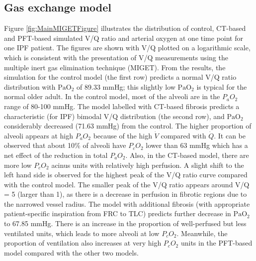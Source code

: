 \subsection{Gas exchange model}
Figure \ref{fig:MainMIGETFigure} illustrates the distribution of control, CT-based and PFT-based simulated V/Q ratio and arterial oxygen at one time point for one IPF patient. The figures are shown with V/Q plotted on a logarithmic scale, which is consistent with the presentation of V/Q measurements using the multiple inert gas elimination technique (MIGET). From the results, the simulation for the control model (the first row) predicts a normal V/Q ratio distribution with $\mathrm{PaO_2}$ of 89.33 mmHg; this slightly low $\mathrm{PaO_2}$ is typical for the normal older adult. In the control model, most of the alveoli are in the $P_aO_2$ range of 80-100 mmHg. The model labelled with CT-based fibrosis predicts a characteristic (for IPF) bimodal V/Q distribution (the second row), and $\mathrm{PaO_2}$ considerably decreased (71.63 mmHg) from the control. The higher proportion of alveoli appears at high $P_aO_2$ because of the high $\dot{V}$ compared with $\dot{Q}$. It can be observed that about 10\% of alveoli have $P_cO_2$ lower than 63 mmHg which has a net effect of the reduction in total $P_aO_2$. Also, in the CT-based model, there are more low $P_cO_2$ acinus units with relatively high perfusion. A slight shift to the left hand side is observed for the highest peak of the V/Q ratio curve compared with the control model. The smaller peak of the V/Q ratio appears around V/Q = 5 (larger than 1), as there is a decrease in perfusion in fibrotic regions due to the narrowed vessel radius. The model with additional fibrosis (with appropriate patient-specific inspiration from FRC to TLC) predicts further decrease in $\mathrm{PaO_2}$ to 67.85 mmHg. There is an increase in the proportion of well-perfused but less ventilated units, which leads to more alveoli at low $P_cO_2$. Meanwhile, the proportion of ventilation also increases at very high $P_cO_2$ units in the PFT-based model compared with the other two models.

